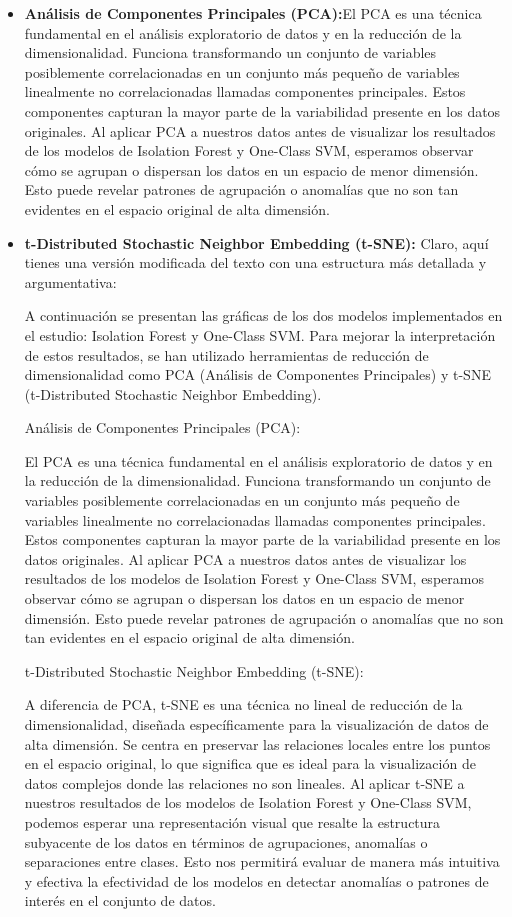 \begin{itemize}
	\item {\textbf{Análisis de Componentes Principales (PCA):}}El PCA es una técnica fundamental en el análisis exploratorio de datos y en la reducción de la dimensionalidad. Funciona transformando un conjunto de variables posiblemente correlacionadas en un conjunto más pequeño de variables linealmente no correlacionadas llamadas componentes principales. Estos componentes capturan la mayor parte de la variabilidad presente en los datos originales. Al aplicar PCA a nuestros datos antes de visualizar los resultados de los modelos de Isolation Forest y One-Class SVM, esperamos observar cómo se agrupan o dispersan los datos en un espacio de menor dimensión. Esto puede revelar patrones de agrupación o anomalías que no son tan evidentes en el espacio original de alta dimensión.
	
	\item {\textbf{t-Distributed Stochastic Neighbor Embedding (t-SNE):}} 
Claro, aquí tienes una versión modificada del texto con una estructura más detallada y argumentativa:

A continuación se presentan las gráficas de los dos modelos implementados en el estudio: Isolation Forest y One-Class SVM. Para mejorar la interpretación de estos resultados, se han utilizado herramientas de reducción de dimensionalidad como PCA (Análisis de Componentes Principales) y t-SNE (t-Distributed Stochastic Neighbor Embedding).

Análisis de Componentes Principales (PCA):

El PCA es una técnica fundamental en el análisis exploratorio de datos y en la reducción de la dimensionalidad. Funciona transformando un conjunto de variables posiblemente correlacionadas en un conjunto más pequeño de variables linealmente no correlacionadas llamadas componentes principales. Estos componentes capturan la mayor parte de la variabilidad presente en los datos originales. Al aplicar PCA a nuestros datos antes de visualizar los resultados de los modelos de Isolation Forest y One-Class SVM, esperamos observar cómo se agrupan o dispersan los datos en un espacio de menor dimensión. Esto puede revelar patrones de agrupación o anomalías que no son tan evidentes en el espacio original de alta dimensión.

t-Distributed Stochastic Neighbor Embedding (t-SNE):

A diferencia de PCA, t-SNE es una técnica no lineal de reducción de la dimensionalidad, diseñada específicamente para la visualización de datos de alta dimensión. Se centra en preservar las relaciones locales entre los puntos en el espacio original, lo que significa que es ideal para la visualización de datos complejos donde las relaciones no son lineales. Al aplicar t-SNE a nuestros resultados de los modelos de Isolation Forest y One-Class SVM, podemos esperar una representación visual que resalte la estructura subyacente de los datos en términos de agrupaciones, anomalías o separaciones entre clases. Esto nos permitirá evaluar de manera más intuitiva y efectiva la efectividad de los modelos en detectar anomalías o patrones de interés en el conjunto de datos.
\end{itemize}


